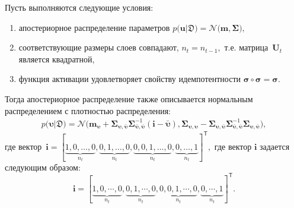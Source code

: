 \begin{theorem}
\label{theorem:ap:layer}
Пусть выполняются следующие условия:
\begin{enumerate}[1)]
\item апостериорное распределение параметров $p\bigr(\mathbf{u}|\mathfrak{D}\bigr) = \mathcal{N}\bigr(\mathbf{m}, \bm{\Sigma}\bigr),$
\item соответствующие размеры слоев совпадают, $n_t=n_{t-1},$ т.е. матрица~$\mathbf{U}_t$ является квадратной,
\item функция активации удовлетворяет свойству идемпотентности $\bm{\sigma} \circ \bm{\sigma} = \bm{\sigma}$.
\end{enumerate}
Тогда апостериорное распределение также описывается нормальным распределением с плотностью распределения:
\[
\label{eq:ap:5}
\begin{aligned}
p\bigr(\bm{\upsilon}|\mathfrak{D}\bigr) = \mathcal{N}\bigr(\mathbf{m}_{\bm{\upsilon}}+\bm{\Sigma}_{\bm{\upsilon},\bar{\bm{\upsilon}}} \bm{\Sigma}_{\bar{\bm{\upsilon}},\bar{\bm{\upsilon}}}^{-1} \left(\mathbf{i} - \bar{\bm{\upsilon}}\right), \bm{\Sigma}_{\bm{\upsilon},\bm{\upsilon}} - \bm{\Sigma}_{\bm{\upsilon},\bar{\bm{\upsilon}}}\bm{\Sigma}_{\bar{\bm{\upsilon}},\bar{\bm{\upsilon}}}^{-1}\bm{\Sigma}_{\bm{\upsilon},\bar{\bm{\upsilon}}}\bigr),
\end{aligned}
\]
где вектор~$
\mathbf{i}=[\underbrace{1, 0, \ldots, 0}_{n_t}, \underbrace{0, 1, \ldots, 0}_{n_t}, \underbrace{0, 0, 1, \ldots, 0}_{n_t}, \underbrace{0, \ldots, 1}_{n_t}]^{\mathsf{T}},
$
где вектор $\mathbf{i}$ задается следующим образом:
\[
\mathbf{i}=[\underbrace{1, 0, \cdots, 0}_{n_t}, \underbrace{0, 1, \cdots, 0}_{n_t}, \underbrace{0, 0, 1, \cdots, 0}_{n_t}, \underbrace{0, \cdots, 1}_{n_t}]^{\mathsf{T}}.
\]
\end{theorem}
